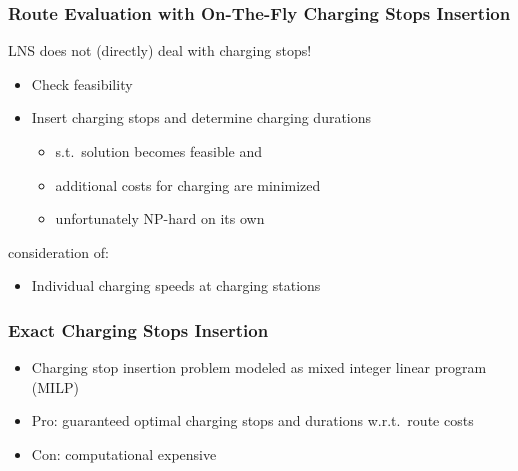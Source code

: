 \documentclass[aspectratio=1610]{beamer}
\newcommand{\important}[1]{{\color{green!60!black}#1}}
\begin{document}
\begin{frame}
	\frametitle{Route Evaluation with On-The-Fly Charging Stops Insertion}
	
\important{LNS does not (directly) deal with charging stops!}

\bigskip 
{} 

\smallskip
\begin{itemize}
	\item Check feasibility
	\smallskip
	\item \important{Insert charging stops and determine charging durations}
	\begin{itemize}
		\item s.t.\ solution becomes feasible and
		\item additional costs for charging are minimized
		\item \alert{unfortunately NP-hard on its own}
	\end{itemize}
	\smallskip
\end{itemize}

\bigskip


 consideration of: 
\smallskip
\begin{itemize}
	\item Individual charging speeds at charging stations
\end{itemize}

	
\end{frame}

\begin{frame}
  \frametitle{Exact Charging Stops Insertion}

\begin{itemize}
	\itemsep2ex
	\item Charging stop insertion problem modeled as \important{mixed integer linear program (MILP)}
	\item Pro: guaranteed optimal charging stops and durations w.r.t.\ route costs
	\item Con: computational expensive
\end{itemize}


\end{frame}
\end{document}
